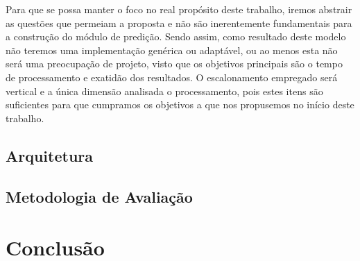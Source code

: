 \documentclass[twoside,english,brazilian]{UNISINOSmonografia}
\begin{document}
Para que se possa manter o foco no real propósito deste trabalho, iremos abstrair as questões que permeiam a proposta e não são inerentemente fundamentais para a construção do módulo de predição. Sendo assim, como resultado deste modelo não teremos uma implementação genérica ou adaptável, ou ao menos esta não será uma preocupação de projeto, visto que os objetivos principais são o tempo de processamento e exatidão dos resultados. O escalonamento empregado será vertical e a única dimensão analisada o processamento, pois estes itens são suficientes para que cumpramos os objetivos a que nos propusemos no início deste trabalho. 

\section{Arquitetura}


\section{Metodologia de Avaliação}

\chapter{Conclusão}





\appendix
\end{document}
